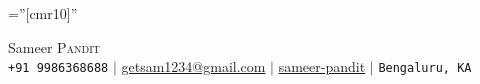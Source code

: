 \documentclass[a4paper,10pt]{article}
\begin{document}

\pagestyle{empty} %

\font\fb=''[cmr10]'' %

\begin{center}
    {\Huge Sameer \textsc{Pandit}} \\ \vspace{5pt}
    \small \faPhone* \texttt{+91 9986368688} \hspace{1pt} $|$
    \hspace{1pt} \faEnvelope \hspace{2pt} \href{mailto:getsam1234@gmail.com}{getsam1234@gmail.com} \hspace{1pt} $|$ 
    \hspace{1pt} \faLinkedin \hspace{2pt} \href{www.linkedin.com/in/sameer-pandit-60007919}{sameer-pandit} \hspace{1pt} $|$
    \hspace{1pt} \faMapMarker* \hspace{2pt}\texttt{Bengaluru, KA}
    \\ \vspace{-3pt}
\end{center}

\hfill \break
\end{document}
